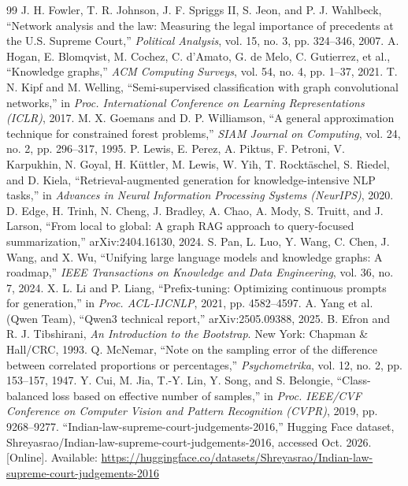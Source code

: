 \begin{thebibliography}{99}
 J. H. Fowler, T. R. Johnson, J. F. Spriggs II, S. Jeon, and P. J. Wahlbeck, ``Network analysis and the law: Measuring the legal importance of precedents at the U.S. Supreme Court,'' \emph{Political Analysis}, vol. 15, no. 3, pp. 324--346, 2007.
 A. Hogan, E. Blomqvist, M. Cochez, C. d'Amato, G. de Melo, C. Gutierrez, et al., ``Knowledge graphs,'' \emph{ACM Computing Surveys}, vol. 54, no. 4, pp. 1--37, 2021.
 T. N. Kipf and M. Welling, ``Semi-supervised classification with graph convolutional networks,'' in \emph{Proc. International Conference on Learning Representations (ICLR)}, 2017.
 M. X. Goemans and D. P. Williamson, ``A general approximation technique for constrained forest problems,'' \emph{SIAM Journal on Computing}, vol. 24, no. 2, pp. 296--317, 1995.
 P. Lewis, E. Perez, A. Piktus, F. Petroni, V. Karpukhin, N. Goyal, H. K\"uttler, M. Lewis, W. Yih, T. Rockt\"aschel, S. Riedel, and D. Kiela, ``Retrieval-augmented generation for knowledge-intensive NLP tasks,'' in \emph{Advances in Neural Information Processing Systems (NeurIPS)}, 2020.
 D. Edge, H. Trinh, N. Cheng, J. Bradley, A. Chao, A. Mody, S. Truitt, and J. Larson, ``From local to global: A graph RAG approach to query-focused summarization,'' arXiv:2404.16130, 2024.
 S. Pan, L. Luo, Y. Wang, C. Chen, J. Wang, and X. Wu, ``Unifying large language models and knowledge graphs: A roadmap,'' \emph{IEEE Transactions on Knowledge and Data Engineering}, vol. 36, no. 7, 2024.
 X. L. Li and P. Liang, ``Prefix-tuning: Optimizing continuous prompts for generation,'' in \emph{Proc. ACL-IJCNLP}, 2021, pp. 4582--4597.
 A. Yang et al. (Qwen Team), ``Qwen3 technical report,'' arXiv:2505.09388, 2025.
 B. Efron and R. J. Tibshirani, \emph{An Introduction to the Bootstrap}. New York: Chapman \& Hall/CRC, 1993.
 Q. McNemar, ``Note on the sampling error of the difference between correlated proportions or percentages,'' \emph{Psychometrika}, vol. 12, no. 2, pp. 153--157, 1947.
 Y. Cui, M. Jia, T.-Y. Lin, Y. Song, and S. Belongie, ``Class-balanced loss based on effective number of samples,'' in \emph{Proc. IEEE/CVF Conference on Computer Vision and Pattern Recognition (CVPR)}, 2019, pp. 9268--9277.
 ``Indian-law-supreme-court-judgements-2016,'' Hugging Face dataset, Shreyasrao/Indian-law-supreme-court-judgements-2016, accessed Oct. 2026. [Online]. Available: \url{https://huggingface.co/datasets/Shreyasrao/Indian-law-supreme-court-judgements-2016}

\end{thebibliography}
